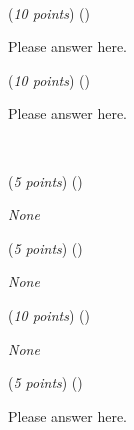 \documentclass{template}
\begin{document}
\newpage

\begin{problem}
~\newline
~\newline


\begin{subproblem}
(\textit{10 points}) (\scoretextemoji{}\scorecodeemoji{})


\end{subproblem}

\begin{solution}
Please answer here.
\end{solution}

\begin{subproblem}
(\textit{10 points}) (\scoretextemoji{}\scorecodeemoji{})


\end{subproblem}

\begin{solution}
Please answer here.
\end{solution}
\end{problem}

\newpage

\begin{problem}
~\newline
~\newline


\begin{subproblem}
(\textit{5 points}) (\scorecodeemoji{})


\end{subproblem}

\begin{solution}
\textit{None}
\end{solution}

\begin{subproblem}
(\textit{5 points}) (\scorecodeemoji{})


\end{subproblem}

\begin{solution}
\textit{None}
\end{solution}

\begin{subproblem}
(\textit{10 points}) (\scorecodeemoji{})


\end{subproblem}

\begin{solution}
\textit{None}
\end{solution}

\begin{subproblem}
(\textit{5 points}) (\scoreplotemoji{})


\end{subproblem}

\begin{solution}
Please answer here.
\end{solution}
\end{problem}
\end{document}
